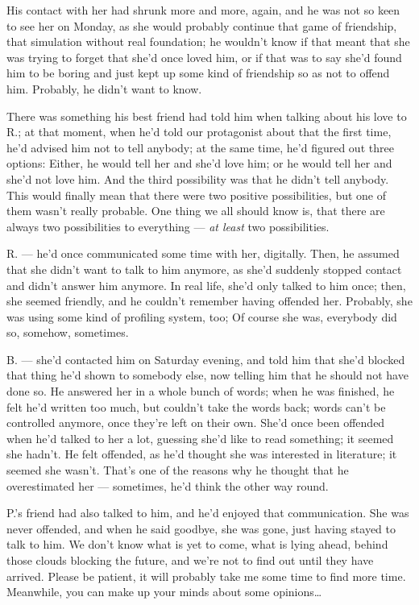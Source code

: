 His contact with her had shrunk more and more, again, and he was not so keen to see her on Monday, as she would probably continue that game of friendship, that simulation without real foundation; he wouldn't know if that meant that she was trying to forget that she'd once loved him, or if that was to say she'd found him to be boring and just kept up some kind of friendship so as not to offend him.
Probably, he didn't want to know.

There was something his best friend had told him when talking about his love to R.; at that moment, when he'd told our protagonist about that the first time, he'd advised him not to tell anybody; at the same time, he'd figured out three options: Either, he would tell her and she'd love him; or he would tell her and she'd not love him. And the third possibility was that he didn't tell anybody. This would finally mean that there were two positive possibilities, but one of them wasn't really probable. One thing we all should know is, that there are always two possibilities to everything --- \emph{at least} two possibilities.

R. --- he'd once communicated some time with her, digitally. Then, he assumed that she didn't want to talk to him anymore, as she'd suddenly stopped contact and didn't answer him anymore. In real life, she'd only talked to him once; then, she seemed friendly, and he couldn't remember having offended her. Probably, she was using some kind of profiling system, too; Of course she was, everybody did so, somehow, sometimes.

B. --- she'd contacted him on Saturday evening, and told him that she'd blocked that thing he'd shown to somebody else, now telling him that he should not have done so. He answered her in a whole bunch of words; when he was finished, he felt he'd written too much, but couldn't take the words back; words can't be controlled anymore, once they're left on their own. She'd once been offended when he'd talked to her a lot, guessing she'd like to read something; it seemed she hadn't. He felt offended, as he'd thought she was interested in literature; it seemed she wasn't. 
That's one of the reasons why he thought that he overestimated her --- sometimes, he'd think the other way round.

P.'s friend had also talked to him, and he'd enjoyed that communication. She was never offended, and when he said goodbye, she was gone, just having stayed to talk to him. 
We don't know what is yet to come, what is lying ahead, behind those clouds blocking the future, and we're not to find out until they have arrived. 
Please be patient, it will probably take me some time to find more time. 
Meanwhile, you can make up your minds about some opinions\ldots

